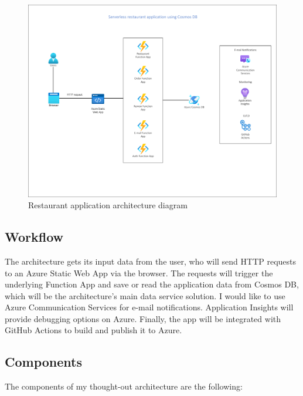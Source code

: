 \begin{figure}[!ht]
	\centering
	\includegraphics[width=150mm, keepaspectratio]{figures/AppArch}
	\caption{Restaurant application architecture diagram} 
	\label{fig:AppArch}
\end{figure}

\subsection{Workflow}

The architecture gets its input data from the user, who will send HTTP requests to an Azure Static Web App via the browser. The requests will trigger the underlying Function App and save or read the application data from Cosmos DB, which will be the architecture's main data service solution. I would like to use Azure Communication Services for e-mail notifications. Application Insights will provide debugging options on Azure. Finally, the app will be integrated with GitHub Actions to build and publish it to Azure.

\subsection{Components}

The components of my thought-out architecture are the following:

